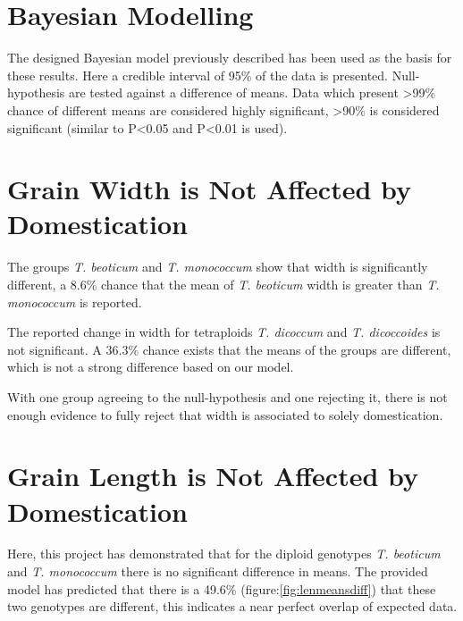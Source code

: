 \documentclass[11pt]{report}
\begin{document}
\section{Bayesian Modelling}
\label{sec:orgd7bc125}
The designed Bayesian model previously described has been used as the basis for these results. Here a credible interval of 95\% of the data is presented. Null-hypothesis are tested against a difference of means. Data which present >99\% chance of different means are considered highly significant, >90\% is considered significant (similar to P<0.05 and P<0.01 is used).


\section{Grain Width is Not Affected by Domestication}
\label{sec:org57c1c16}

The groups \emph{T. beoticum} and \emph{T. monococcum} show  that width is significantly different, a 8.6\% chance that the mean of \emph{T. beoticum} width is greater than \emph{T. monococcum} is reported.

The reported change in width for tetraploids \emph{T. dicoccum} and \emph{T. dicoccoides} is not significant. A 36.3\% chance exists that the means of the groups are different, which is not a strong difference based on our model.

With one group agreeing to the null-hypothesis and one rejecting it, there is not enough evidence to fully reject that width is associated to solely domestication.

\clearpage
\section{Grain Length is Not Affected by Domestication}
\label{sec:org58200ce}

Here, this project has demonstrated that for the diploid genotypes \emph{T. beoticum} and \emph{T. monococcum} there is no significant difference in means. The provided model has predicted that there is a 49.6\% (figure:\ref{fig:lenmeansdiff}) that these two genotypes are different, this indicates a near perfect overlap of expected data.
\end{document}
